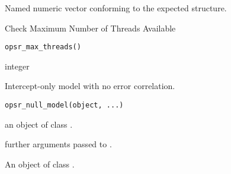 \documentclass[letterpaper]{book}
\begin{document}
%
\begin{Value}
Named numeric vector conforming to the expected structure.
\end{Value}
%
\begin{SeeAlso}
\end{SeeAlso}
%
\begin{Description}
Check Maximum Number of Threads Available
\end{Description}
%
\begin{Usage}
\begin{verbatim}
opsr_max_threads()
\end{verbatim}
\end{Usage}
%
\begin{Value}
integer
\end{Value}
%
\begin{SeeAlso}
\end{SeeAlso}
%
\begin{Description}
Intercept-only model with no error correlation.
\end{Description}
%
\begin{Usage}
\begin{verbatim}
opsr_null_model(object, ...)
\end{verbatim}
\end{Usage}
%
\begin{Arguments}
\begin{ldescription}
\item[\code{object}] an object of class .

\item[\code{...}] further arguments passed to .
\end{ldescription}
\end{Arguments}
%
\begin{Value}
An object of class .
\end{Value}
%
\begin{Examples}
\end{Examples}
\end{document}
